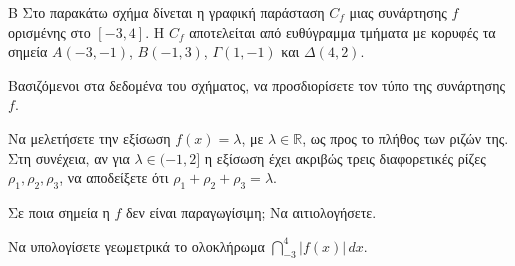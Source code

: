 \begin{thema}{Β}
Στο παρακάτω σχήμα δίνεται η γραφική παράσταση $C_f$ μιας συνάρτησης $f$ ορισμένης στο $[-3, 4]$. Η $C_f$ αποτελείται από ευθύγραμμα τμήματα με κορυφές τα σημεία $A(-3, -1)$, $B(-1, 3)$, $\Gamma(1, -1)$ και $\Delta(4, 2)$.

\begin{center}
\end{center}

\begin{erwthma}
  \item Βασιζόμενοι στα δεδομένα του σχήματος, να προσδιορίσετε τον τύπο της συνάρτησης $f$.
  \item Να μελετήσετε την εξίσωση $f(x) = \lambda$, με $\lambda \in \mathbb{R}$, ως προς το πλήθος των ριζών της. Στη συνέχεια, αν για $\lambda \in (-1, 2]$ η εξίσωση έχει ακριβώς τρεις διαφορετικές ρίζες $\rho_1, \rho_2, \rho_3$, να αποδείξετε ότι $\rho_1 + \rho_2 + \rho_3 = \lambda$.
  \item Σε ποια σημεία η $f$ δεν είναι παραγωγίσιμη; Να αιτιολογήσετε.
  \item Να υπολογίσετε γεωμετρικά το ολοκλήρωμα $\dint_{-3}^{4} |f(x)| \, dx$.
\end{erwthma}
\end{thema}


